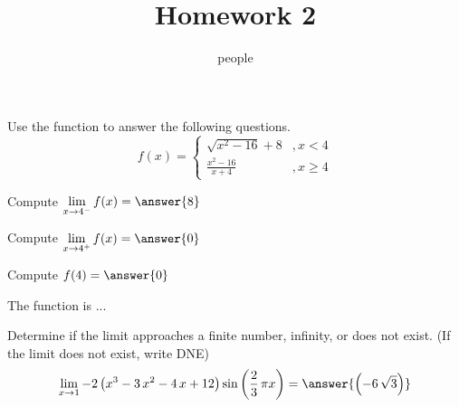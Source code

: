 \documentclass[•]{ximera}
\title{Homework 2}
\author{people}
\begin{document}
\maketitle

\begin{shuffle}%
\begin{exercise}

Use the function to answer the following questions.
\[f(x)=\left\{\begin{array}{ll}{{\sqrt{x^{2} - 16} + 8}}&,x<{{4}}\\[5pt]
{{\frac{x^{2} - 16}{x + 4}}}&,x\geq{{4}}
\end{array}\right.\]
\begin{shuffle}%
\begin{problem}
Compute $\lim\limits_{x\to{{4}}^-}f(x)=\answer{{{8}}}$\\[1in]
\end{problem}
\begin{problem}
Compute $\lim\limits_{x\to{{4}}^+}f(x)=\answer{{{0}}}$\\[1in]
\end{problem}
\begin{problem}
Compute $f({{4}})=\answer{{{0}}}$\\[1in]
\end{problem}
\begin{problem}
The function is ...
\begin{multipleChoice}
\end{multipleChoice}
\end{problem}
\end{shuffle}
\end{exercise}%





\begin{exercise}
Determine if the limit approaches a finite number, infinity, or does not exist. (If the limit does not exist, write DNE)
\[\lim_{x\to{{1}}}{{-2 \, {\left(x^{3} - 3 \, x^{2} - 4 \, x + 12\right)} \sin\left(\frac{2}{3} \, \pi x\right)}}=\answer{{{\left(-6 \, \sqrt{3}\right)}}}\]

\end{exercise}%
\end{shuffle}
\end{document}
